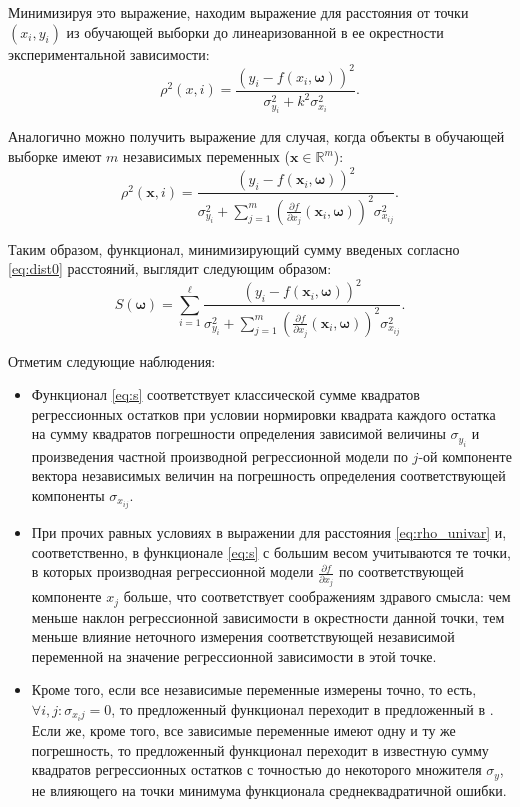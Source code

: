 \documentclass[11pt,a4paper]{article}
\newcommand{\bomega}{\boldsymbol{\omega}}
\begin{document}
Минимизируя это выражение, находим выражение для расстояния от
точки $(x_i, y_i)$ из обучающей выборки до линеаризованной в ее
окрестности экспериментальной зависимости:
\begin{equation}
  \rho^2(x, i) = \frac{(y_i - f(x_i, \bomega))^2}{\sigma^2_{y_i} + k^2 \sigma^2_{x_i}}.
  \label{eq:rho_univar}
\end{equation}

Аналогично можно получить выражение для случая, когда объекты в обучающей выборке
имеют $m$ независимых переменных ($\mathbf{x} \in \mathbb{R}^m$):
\[
  \rho^2(\mathbf{x}, i) = \frac{(y_i - f(\mathbf{x}_i, \bomega))^2}{\sigma_{y_i}^2 + \sum_{j = 1}^m (\frac{\partial f}{\partial x_j}(\mathbf{x}_i, \bomega))^2 \sigma^2_{x_{ij}}}.
\]

Таким образом, функционал, минимизирующий сумму введеных согласно \eqref{eq:dist0}
расстояний, выглядит следующим образом:
\begin{equation}
  S(\bomega) = \sum_{i = 1}^\ell \frac{(y_i - f(\mathbf{x}_i, \bomega))^2}{\sigma_{y_i}^2 + \sum_{j = 1}^m (\frac{\partial f}{\partial x_j}(\mathbf{x}_i, \bomega))^2 \sigma^2_{x_{ij}}}.
  \label{eq:s}
\end{equation}

Отметим следующие наблюдения:
\begin{itemize}
  \item Функционал \eqref{eq:s} соответствует классической сумме квадратов регрессионных
	остатков при условии нормировки квадрата каждого остатка на сумму квадратов погрешности
	определения зависимой величины $\sigma_{y_i}$ и произведения частной производной
	регрессионной модели по $j$-ой компоненте вектора независимых величин на погрешность
	определения соответствующей компоненты $\sigma_{x_{ij}}$.

  \item При прочих равных условиях в выражении для расстояния \eqref{eq:rho_univar} и,
	соответственно, в функционале \eqref{eq:s} с большим весом учитываются те точки, в которых
	производная регрессионной модели $\frac{\partial f}{\partial x_j}$ по соответствующей
	компоненте $x_j$ больше, что соответствует соображениям здравого смысла: чем меньше наклон
	регрессионной зависимости в окрестности данной точки, тем меньше влияние неточного
	измерения соответствующей независимой переменной на значение регрессионной зависимости
	в этой точке.

  \item Кроме того, если все независимые переменные измерены точно, то есть,
	$\forall i, j : \sigma_{x_ij} = 0$, то предложенный функционал переходит в предложенный
	в \cite{...}. Если же, кроме того, все зависимые переменные имеют одну и ту же погрешность,
	то предложенный функционал переходит в известную сумму квадратов регрессионных остатков
	с точностью до некоторого множителя $\sigma_y$, не влияющего на точки минимума функционала
	среднеквадратичной ошибки.
\end{itemize}
\end{document}
